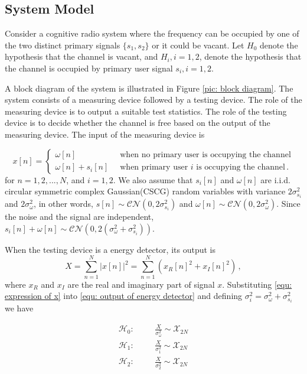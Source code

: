 \documentclass[12pt,journal,a4paper,twoside,onecolumn]{IEEEtran}
\begin{document}
\begin{spacing}{2.5}
\subsection{System Model}
Consider a cognitive radio system where the frequency can be occupied by one of the two  distinct primary signals $\{ s_1, s_2 \}$ or it could be vacant.
Let  $H_0$  denote the hypothesis that the channel is vacant, and $H_i, i = 1, 2$, denote the hypothesis that the channel is occupied by primary user signal $s_i, i=1, 2$. 

A block diagram of the system is illustrated in Figure \ref{pic: block diagram}. The system consists of a measuring device followed by a testing device. The role of the measuring device is to output a suitable test statistics. The role of the testing device is to decide whether the channel is free based on the output of the measuring device. The input of the measuring device is

\begin{equation}
  \label{equ: expression of x}
  x[n]=\begin{cases}
    \omega[n]\;\;\;\;\;\;\;\;\;\;\;\;\;\;&\text{when no primary user is occupying the channel}\\
    \omega[n] + s_i[n]\;\;&\text{when primary user $i$ is occupying the channel}\,.
  \end{cases}
\end{equation}
for $n = 1, 2, ..., N$, and $i = 1, 2$. We also assume that $s_i[n]$ and $\omega[n]$ are i.i.d. circular symmetric complex Gaussian(CSCG) random variables with variance $2\sigma_{s_i}^2$ and $2\sigma_{\omega}^2$, in other words, $s[n] \sim \mathcal{CN}(0, 2\sigma_{s_i}^2) $ and $\omega[n] \sim \mathcal{CN}(0, 2\sigma_\omega^2)$. Since the noise and the signal are independent, $s_i[n] + \omega[n] \sim \mathcal{CN}(0, 2(\sigma_\omega^2 + \sigma_{s_i}^2))$.

When the testing device is a energy detector, its output is
\begin{equation}
  \label{equ: output of energy detector}
  X = \sum_{n=1}^{N}|x[n]|^2 = \sum_{n=1}^{N}(x_R[n]^2+x_I[n]^2)\,,
\end{equation}
where $x_R$ and $x_I$ are the real and imaginary part of signal $x$. Substituting \eqref{equ: expression of x} into \eqref{equ: output of energy detector} and defining $\sigma_{i}^2 = \sigma_\omega^2 + \sigma_{s_i}^2$ we have

  \begin{equation}
   \label{v3eq7}
   \begin{split}
     \mathcal{H}_0:\;\;\;\;\;\;&\frac{X}{\sigma_\omega^2} \sim \mathcal{X}_{2N}\\
     \mathcal{H}_1:\;\;\;\;\;\;&\frac{X}{\sigma_1^2} \sim \mathcal{X}_{2N}\\
     \mathcal{H}_2:\;\;\;\;\;\;&\frac{X}{\sigma_{2}^2} \sim \mathcal{X}_{2N}
     \end{split}
 \end{equation}


\end{spacing}
\end{document}
